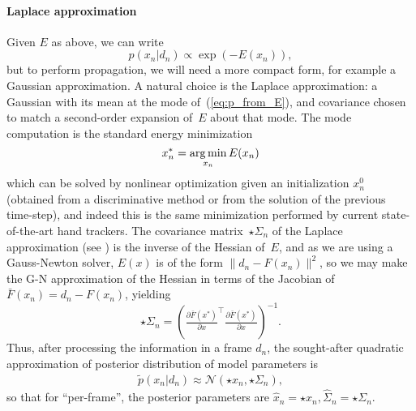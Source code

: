 \paragraph{Laplace approximation}
\label{sec:posterior}
Given $E$ as above, we can write
\begin{equation}
p(x_n|d_n) \propto \exp(-E(x_n)), 
\label{eq:p_from_E}
\end{equation}
but to perform propagation, we will need a more compact form, for example a Gaussian approximation.   A natural choice is the Laplace approximation: a Gaussian with its mean at the mode of~(\ref{eq:p_from_E}), and covariance chosen to match a second-order expansion of~$E$ about that mode.
The mode computation is the standard energy minimization
\begin{equation}
{x}^*_n = \operatorname*{arg\,min}_{x_n} E(x_n)
\label{eq:xmin}
\end{equation}
which can be solved by nonlinear optimization given an initialization $x_n^0$ (obtained from a discriminative method or from the solution of the previous time-step), and indeed this is the same minimization performed by current state-of-the-art hand trackers.
The covariance matrix~$\star\Sigma_n$ of the Laplace approximation (see ) is the inverse of the Hessian of~$E$, and as we are using a Gauss-Newton solver, $E(x)$ is of the form $\|d_n - F(x_n)\|^2$, so we may make the G-N approximation of the Hessian in terms of the Jacobian of~
$\bar{F}(x_n) = d_n - F(x_n)$, yielding
\begin{equation}
{\star{\Sigma}_n} = \left(\tfrac{\partial \bar{F}(x^*)}{\partial x}^\top \tfrac{\partial \bar{F}(x^*)}{\partial x}\right)^{-1}.
\end{equation}
Thus, after processing the information in a frame $d_n$, the sought-after quadratic approximation of posterior distribution of model parameters is 
\begin{align}
\tilde{p}(x_n|d_n) \approx \mathcal{N}\left(\star{x}_n, \star{\Sigma}_n \right),
\end{align}
so that for ``per-frame'', the posterior parameters are $\hat x_n = \star x_n, \hat\Sigma_n = \star\Sigma_n$.


